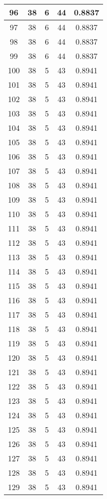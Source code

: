 \documentclass[letterpaper, 12pt]{article}
\begin{document}
\begin{longtable}{|c|c|c|c|c|}
\hline
96 & 38 & 6 & 44 & 0.8837 \\
\hline
97 & 38 & 6 & 44 & 0.8837 \\
\hline
98 & 38 & 6 & 44 & 0.8837 \\
\hline
99 & 38 & 6 & 44 & 0.8837 \\
\hline
100 & 38 & 5 & 43 & 0.8941 \\
\hline
101 & 38 & 5 & 43 & 0.8941 \\
\hline
102 & 38 & 5 & 43 & 0.8941 \\
\hline
103 & 38 & 5 & 43 & 0.8941 \\
\hline
104 & 38 & 5 & 43 & 0.8941 \\
\hline
105 & 38 & 5 & 43 & 0.8941 \\
\hline
106 & 38 & 5 & 43 & 0.8941 \\
\hline
107 & 38 & 5 & 43 & 0.8941 \\
\hline
108 & 38 & 5 & 43 & 0.8941 \\
\hline
109 & 38 & 5 & 43 & 0.8941 \\
\hline
110 & 38 & 5 & 43 & 0.8941 \\
\hline
111 & 38 & 5 & 43 & 0.8941 \\
\hline
112 & 38 & 5 & 43 & 0.8941 \\
\hline
113 & 38 & 5 & 43 & 0.8941 \\
\hline
114 & 38 & 5 & 43 & 0.8941 \\
\hline
115 & 38 & 5 & 43 & 0.8941 \\
\hline
116 & 38 & 5 & 43 & 0.8941 \\
\hline
117 & 38 & 5 & 43 & 0.8941 \\
\hline
118 & 38 & 5 & 43 & 0.8941 \\
\hline
119 & 38 & 5 & 43 & 0.8941 \\
\hline
120 & 38 & 5 & 43 & 0.8941 \\
\hline
121 & 38 & 5 & 43 & 0.8941 \\
\hline
122 & 38 & 5 & 43 & 0.8941 \\
\hline
123 & 38 & 5 & 43 & 0.8941 \\
\hline
124 & 38 & 5 & 43 & 0.8941 \\
\hline
125 & 38 & 5 & 43 & 0.8941 \\
\hline
126 & 38 & 5 & 43 & 0.8941 \\
\hline
127 & 38 & 5 & 43 & 0.8941 \\
\hline
128 & 38 & 5 & 43 & 0.8941 \\
\hline
129 & 38 & 5 & 43 & 0.8941 \\

\end{longtable}
\end{document}
